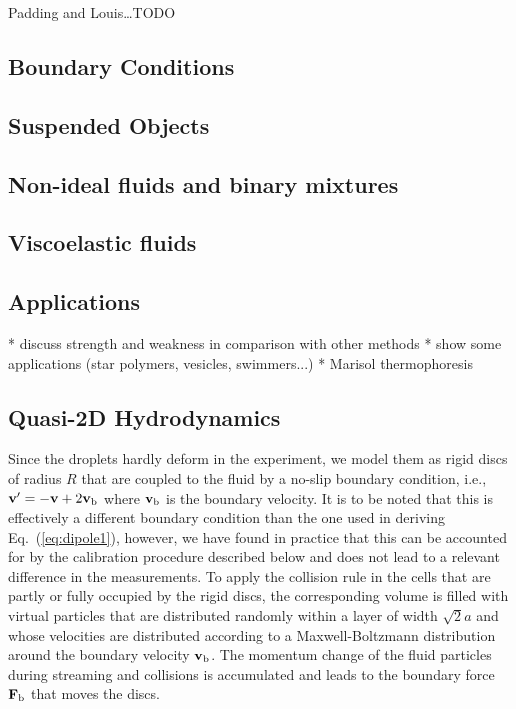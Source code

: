 \documentclass[8.5pt,twoside,twocolumn]{article}
\renewcommand{\vec}[1]{{\ensuremath{\mathchoice
                     {\mbox{\boldmath$\displaystyle\mathbf{#1}$}}
                     {\mbox{\boldmath$\textstyle\mathbf{#1}$}}
                     {\mbox{\boldmath$\scriptstyle\mathbf{#1}$}}
                     {\mbox{\boldmath$\scriptscriptstyle\mathbf{#1}$}}}}}%
\newcommand{\vvec}{\ensuremath{\vec{v}}}
\begin{document}
Padding and Louis\dots TODO

\subsection{Boundary Conditions}
\subsection{Suspended Objects}
\subsection{Non-ideal fluids and binary mixtures}
\subsection{Viscoelastic fluids}
\subsection{Applications}

* discuss strength and weakness in comparison with other methods
* show some applications (star polymers, vesicles, swimmers...)
* Marisol thermophoresis

\subsection{Quasi-2D Hydrodynamics}

Since the droplets hardly deform in the experiment, we model them as
rigid discs of radius $R$ that are coupled to the fluid by a no-slip
boundary condition, i.e., $\vvec' = -\vvec + 2\vvec_\text{b}$ where
$\vvec_\text{b}$ is the boundary velocity. It is to be noted that this
is effectively a different boundary condition than the one used in
deriving Eq.~(\ref{eq:dipole1}), however, we have found in practice
that this can be accounted for by the calibration procedure described
below and does not lead to a relevant difference in the
measurements. To apply the collision rule in the cells that are partly
or fully occupied by the rigid discs, the corresponding volume is
filled with virtual particles that are distributed randomly within a
layer of width $\sqrt{2}a$ and whose velocities are distributed
according to a Maxwell-Boltzmann distribution around the boundary
velocity $\vvec_\text{b}$.\cite{Goetze2007} The momentum change of the
fluid particles during streaming and collisions is accumulated and
leads to the boundary force $\vec{F}_\text{b}$ that moves the
discs.\cite{Goetze2011}
\end{document}

